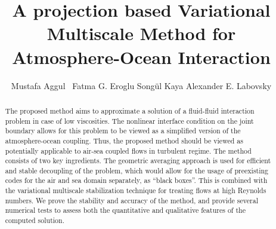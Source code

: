 \documentclass[10pt]{article}%
\numberwithin{equation}{section}
\begin{document}
\date{}

\author{Mustafa Aggul \footnotemark[1]\, \hspace{.1in}Fatma G. Eroglu \footnotemark[2] \hspace{.1in} Song\"{u}l Kaya\footnotemark[3]\hspace{.1in} Alexander E. Labovsky\footnotemark[4] }

\title{A projection based Variational Multiscale Method for Atmosphere-Ocean Interaction}



\maketitle

\renewcommand{\thefootnote}{\fnsymbol{footnote}}





\begin{abstract}
The proposed method aims to approximate a solution of a fluid-fluid interaction problem in case of low viscosities. The nonlinear interface condition on the joint boundary allows for this problem to be viewed as a simplified version of the atmosphere-ocean coupling. Thus, the proposed method should be viewed as potentially applicable to air-sea coupled flows in turbulent regime. The method consists of two key ingredients. The  geometric averaging approach is used for efficient and stable decoupling of the problem, which would allow for the usage of preexisting codes for the air and sea domain separately, as ``black boxes''. This is combined with the variational multiscale stabilization technique for treating flows at high Reynolds numbers. We prove the stability and accuracy of the method, and provide several numerical tests to assess both the quantitative and qualitative features of the computed solution.

\end{abstract}
\end{document}
